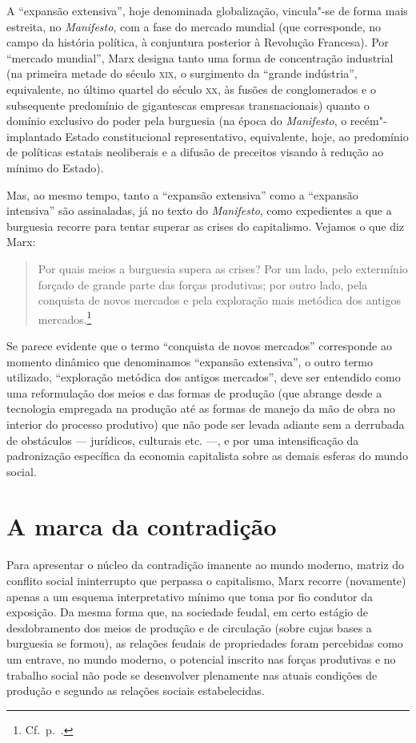 A “expansão extensiva”, hoje denominada globalização, vincula"-se de
forma mais estreita, no \textit{Manifesto}, com a fase do mercado
mundial (que corresponde, no campo da história política, à conjuntura
posterior à Revolução Francesa). Por “mercado mundial”, Marx designa
tanto uma forma de concentração industrial (na primeira metade do
século \textsc{xix}, o surgimento da “grande indústria”, equivalente, no último
quartel do século \textsc{xx}, às fusões de conglomerados e o subsequente
predomínio de gigantescas empresas transnacionais) quanto o domínio
exclusivo do poder pela burguesia (na época do \textit{Manifesto}, o
recém"-implantado Estado constitucional representativo, equivalente,
hoje, ao predomínio de políticas estatais neoliberais e a difusão de
preceitos visando à redução ao mínimo do Estado).

Mas, ao mesmo tempo, tanto a “expansão extensiva” como a “expansão
intensiva” são assinaladas, já no texto do \textit{Manifesto}, como
expedientes a que a burguesia recorre para tentar superar as crises do
capitalismo. Vejamos o que diz Marx:

\begin{quote} 
Por quais meios a burguesia supera as crises? Por um lado, pelo
extermínio forçado de grande parte das forças produtivas; por outro
lado, pela conquista de novos mercados e pela exploração mais metódica
dos antigos mercados.\footnote{ Cf.~p.~\pageref{9}.}
\end{quote} 

Se parece evidente que o termo “conquista de novos mercados” corresponde
ao momento dinâmico que denominamos “expansão extensiva”, o outro termo
utilizado, “exploração metódica dos antigos mercados”, deve ser
entendido como uma reformulação dos meios e das formas de produção (que
abrange desde a tecnologia empregada na produção até as formas de
manejo da mão de obra no interior do processo produtivo) que não
pode ser levada adiante sem a derrubada de obstáculos --- jurídicos,
culturais etc. ---, e por uma intensificação da padronização específica da
economia capitalista sobre as demais esferas do mundo social.

\section*{A marca da contradição}

Para apresentar o núcleo da contradição imanente ao mundo moderno,
matriz do conflito social ininterrupto que perpassa o capitalismo, Marx
recorre (novamente) apenas a um esquema interpretativo mínimo que toma
por fio condutor da exposição. Da mesma forma que, na sociedade feudal,
em certo estágio de desdobramento dos meios de produção e de circulação
(sobre cujas bases a burguesia se formou), as relações feudais de
propriedades foram percebidas como um entrave, no mundo moderno, o
potencial inscrito nas forças produtivas e no trabalho social não pode
se desenvolver plenamente nas atuais condições de produção e segundo as
relações sociais estabelecidas.

